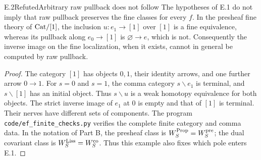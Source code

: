 \begin{claim}{E.2}{Refuted}{Arbitrary raw pullback does not follow}
The hypotheses of E.1 do not imply that raw pullback preserves the fine classes for every $f$. In the presheaf fine theory of $\mathrm{Cat}/[1]$, the inclusion $u:e_1\to[1]$ over $[1]$ is a fine equivalence, whereas its pullback along $e_0\to[1]$ is $\varnothing\to e$, which is not. Consequently the inverse image on the fine localization, when it exists, cannot in general be computed by raw pullback.
\end{claim}
\begin{proof}
The category $[1]$ has objects $0,1$, their identity arrows, and one further arrow $0\to1$. For $s=0$ and $s=1$, the comma category $s\backslash e_1$ is terminal, and $s\backslash[1]$ has an initial object. Thus $s\backslash u$ is a weak homotopy equivalence for both objects. The strict inverse image of $e_1$ at $0$ is empty and that of $[1]$ is terminal. Their nerves have different sets of components. The program \texttt{code/ef\_finite\_checks.py} verifies the complete finite category and comma data. In the notation of Part B, the presheaf class is $W^{\mathrm{Prop}}_S=W^{\mathrm{pre}}_S$; the dual covariant class is $W^{\mathrm{Liss}}_S=W^{\mathrm{co}}_S$. Thus this example also fixes which pole enters E.1.
\end{proof}

